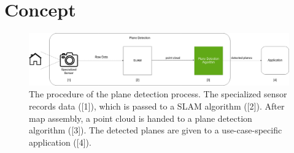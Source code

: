 \documentclass[main.tex]{subfiles}
\begin{document}
\chapter{Concept} \label{chap:Concept}


\begin{figure}[H]
    \centering
    \includegraphics[width=15 cm]{images/concept_specific.png}
    \caption[Concrete Concept Graphic]{The procedure of the plane detection process. The specialized sensor records data ([1]), which is passed to
        a SLAM algorithm ([2]). After map assembly, a point cloud is handed to a plane detection algorithm ([3]).
        The detected planes are given to a use-case-specific application ([4]).}
    \label{fig:concept}
\end{figure}



\end{document}
